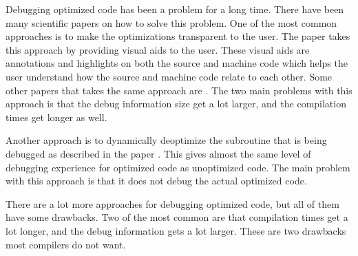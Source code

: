 

Debugging optimized code has been a problem for a long time.
There have been many scientific papers on how to solve this problem.
One of the most common approaches is to make the optimizations transparent to the user.
The paper \cite{edselc.2-52.0-8497669319919920107} takes this approach by providing visual aids to the user.
These visual aids are annotations and highlights on both the source and machine code which helps the user understand how the source and machine code relate to each other.
Some other papers that takes the same  approach are \cite{adl1996source, edselc.2-52.0-002842706219940105}.
The two main problems with this approach is that the debug information size get a lot larger, and the compilation times get longer as well.


Another approach is to dynamically deoptimize the subroutine that is being debugged as described in the paper \cite{edselc.2-52.0-002699386519920107}.
This gives almost the same level of debugging experience for optimized code as unoptimized code.
The main problem with this approach is that it does not debug the actual optimized code.


There are a lot more approaches for debugging optimized code, but all of them have some drawbacks.
Two of the most common are that compilation times get a lot longer, and the debug information gets a lot larger.
These are two drawbacks most compilers do not want.



